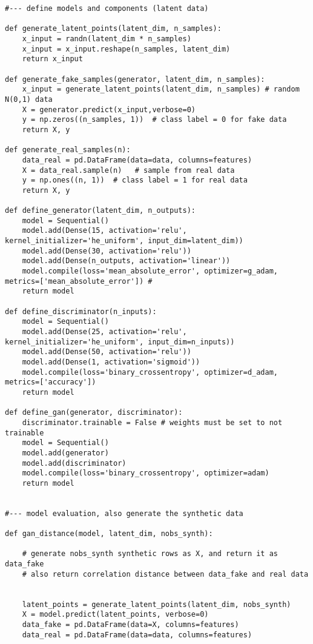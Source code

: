\documentclass[oneside,10pt]{book}
\begin{document}
\begin{lstlisting}
#--- define models and components (latent data)

def generate_latent_points(latent_dim, n_samples):
    x_input = randn(latent_dim * n_samples)
    x_input = x_input.reshape(n_samples, latent_dim)
    return x_input

def generate_fake_samples(generator, latent_dim, n_samples):
    x_input = generate_latent_points(latent_dim, n_samples) # random N(0,1) data
    X = generator.predict(x_input,verbose=0)
    y = np.zeros((n_samples, 1))  # class label = 0 for fake data
    return X, y

def generate_real_samples(n):
    data_real = pd.DataFrame(data=data, columns=features)
    X = data_real.sample(n)   # sample from real data
    y = np.ones((n, 1))  # class label = 1 for real data
    return X, y

def define_generator(latent_dim, n_outputs):
    model = Sequential()
    model.add(Dense(15, activation='relu',  kernel_initializer='he_uniform', input_dim=latent_dim))
    model.add(Dense(30, activation='relu'))
    model.add(Dense(n_outputs, activation='linear'))
    model.compile(loss='mean_absolute_error', optimizer=g_adam, metrics=['mean_absolute_error']) #
    return model

def define_discriminator(n_inputs):
    model = Sequential()
    model.add(Dense(25, activation='relu', kernel_initializer='he_uniform', input_dim=n_inputs))
    model.add(Dense(50, activation='relu'))
    model.add(Dense(1, activation='sigmoid'))
    model.compile(loss='binary_crossentropy', optimizer=d_adam, metrics=['accuracy'])
    return model

def define_gan(generator, discriminator):
    discriminator.trainable = False # weights must be set to not trainable
    model = Sequential()
    model.add(generator)
    model.add(discriminator)
    model.compile(loss='binary_crossentropy', optimizer=adam)
    return model


#--- model evaluation, also generate the synthetic data

def gan_distance(model, latent_dim, nobs_synth):

    # generate nobs_synth synthetic rows as X, and return it as data_fake
    # also return correlation distance between data_fake and real data


    latent_points = generate_latent_points(latent_dim, nobs_synth)
    X = model.predict(latent_points, verbose=0)
    data_fake = pd.DataFrame(data=X, columns=features)
    data_real = pd.DataFrame(data=data, columns=features)


\end{lstlisting}
\end{document}
